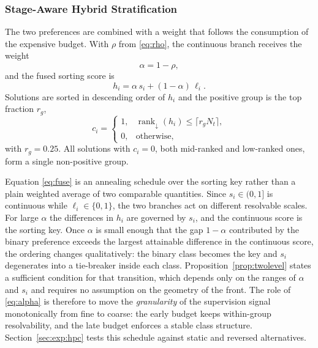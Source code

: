 \documentclass[11pt,a4paper]{article}
\begin{document}
\subsubsection{Stage-Aware Hybrid Stratification}
\label{sec:method:hpc:hybrid}

The two preferences are combined with a weight that follows the consumption of
the expensive budget. With $\rho$ from \eqref{eq:rho}, the continuous branch
receives the weight
\begin{equation}
\alpha=1-\rho,
\label{eq:alpha}
\end{equation}
and the fused sorting score is
\begin{equation}
h_i=\alpha\,s_i+(1-\alpha)\,\ell_i .
\label{eq:fuse}
\end{equation}
Solutions are sorted in descending order of $h_i$ and the positive group is the
top fraction $r_g$,
\begin{equation}
c_i=
\begin{cases}
1, & \operatorname{rank}_{\downarrow}(h_i)\leq\lceil r_gN_t\rceil,\\[2pt]
0, & \text{otherwise},
\end{cases}
\label{eq:group}
\end{equation}
with $r_g=0.25$. All solutions with $c_i=0$, both mid-ranked and low-ranked
ones, form a single non-positive group.

Equation \eqref{eq:fuse} is an annealing schedule over the sorting key rather
than a plain weighted average of two comparable quantities. Since
$s_i\in(0,1]$ is continuous while $\ell_i\in\{0,1\}$, the two branches act on
different resolvable scales. For large $\alpha$ the differences in $h_i$ are
governed by $s_i$, and the continuous score is the sorting key. Once $\alpha$
is small enough that the gap $1-\alpha$ contributed by the binary preference
exceeds the largest attainable difference in the continuous score, the ordering
changes qualitatively: the binary class becomes the key and $s_i$ degenerates
into a tie-breaker inside each class. Proposition~\ref{prop:twolevel} states a
sufficient condition for that transition, which depends only on the ranges of
$\alpha$ and $s_i$ and requires no assumption on the geometry of the front. The
role of \eqref{eq:alpha} is therefore to move the \emph{granularity} of the
supervision signal monotonically from fine to coarse: the early budget keeps
within-group resolvability, and the late budget enforces a stable class
structure. Section~\ref{sec:exp:hpc} tests this schedule against static and
reversed alternatives.
\end{document}
